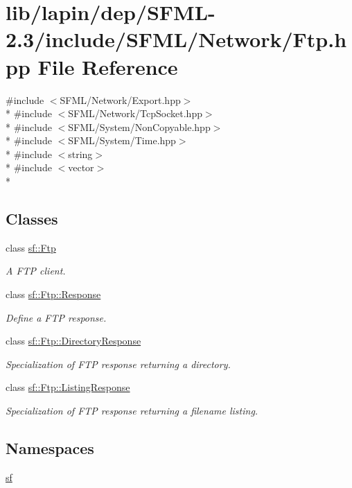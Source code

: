 \hypertarget{lapin_2dep_2_s_f_m_l-2_83_2include_2_s_f_m_l_2_network_2_ftp_8hpp}{\section{lib/lapin/dep/\-S\-F\-M\-L-\/2.3/include/\-S\-F\-M\-L/\-Network/\-Ftp.hpp File Reference}
\label{lapin_2dep_2_s_f_m_l-2_83_2include_2_s_f_m_l_2_network_2_ftp_8hpp}
}
{\ttfamily \#include $<$S\-F\-M\-L/\-Network/\-Export.\-hpp$>$}\\*
{\ttfamily \#include $<$S\-F\-M\-L/\-Network/\-Tcp\-Socket.\-hpp$>$}\\*
{\ttfamily \#include $<$S\-F\-M\-L/\-System/\-Non\-Copyable.\-hpp$>$}\\*
{\ttfamily \#include $<$S\-F\-M\-L/\-System/\-Time.\-hpp$>$}\\*
{\ttfamily \#include $<$string$>$}\\*
{\ttfamily \#include $<$vector$>$}\\*
\subsection*{Classes}
\begin{DoxyCompactItemize}
\item 
class \hyperlink{classsf_1_1_ftp}{sf\-::\-Ftp}
\begin{DoxyCompactList}\small\item\em A F\-T\-P client. \end{DoxyCompactList}\item 
class \hyperlink{classsf_1_1_ftp_1_1_response}{sf\-::\-Ftp\-::\-Response}
\begin{DoxyCompactList}\small\item\em Define a F\-T\-P response. \end{DoxyCompactList}\item 
class \hyperlink{classsf_1_1_ftp_1_1_directory_response}{sf\-::\-Ftp\-::\-Directory\-Response}
\begin{DoxyCompactList}\small\item\em Specialization of F\-T\-P response returning a directory. \end{DoxyCompactList}\item 
class \hyperlink{classsf_1_1_ftp_1_1_listing_response}{sf\-::\-Ftp\-::\-Listing\-Response}
\begin{DoxyCompactList}\small\item\em Specialization of F\-T\-P response returning a filename listing. \end{DoxyCompactList}\end{DoxyCompactItemize}
\subsection*{Namespaces}
\begin{DoxyCompactItemize}
\item 
\hyperlink{namespacesf}{sf}
\end{DoxyCompactItemize}
